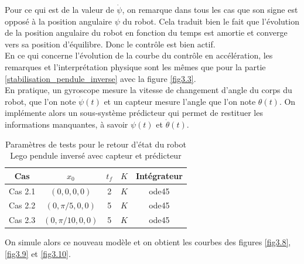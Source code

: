 \documentclass[a4paper]{article}
\begin{document}
                        Pour ce qui est de la valeur de $\dot \psi$, on remarque dans tous les cas que son signe est opposé à la position angulaire $\psi$ du robot.
                        Cela traduit bien le fait que l'évolution de la position angulaire du robot en fonction du temps est amortie et converge vers sa position d'équilibre.
                        Donc le contrôle est bien actif. \\

                        En ce qui concerne l'évolution de la courbe du contrôle en accélération, les remarques et l'interprétation physique sont les mêmes que pour
                        la partie \ref{stabilisation_pendule_inverse} avec la figure \ref{fig3.3}. \\

                        En pratique, un gyroscope mesure la vitesse de changement d'angle du corps du robot, que l'on note $\dot \psi (t)$
                        et un capteur mesure l'angle que l'on note $\theta (t)$.
                        On implémente alors un sous-système prédicteur qui permet de restituer les informations manquantes, à savoir
                        $\psi (t)$ et $\dot \theta (t)$.


                        \begin{table}[h!]
                                \centering
                                \begin{tabular}{|c||c|c|c|c|} \hline
                                        \textbf{Cas} & \textbf{$x_0$} & \textbf{$t_f$} & \textbf{$K$} & \textbf{Intégrateur} \\ \hline
                                        Cas 2.1 & $(0,0,0,0)$ & 2 & $K$ & ode45 \\ \hline
                                        Cas 2.2 & $(0,\pi/5,0,0)$ & 5 & $K$ & ode45 \\ \hline
                                        Cas 2.3 & $(0,\pi/10,0,0)$ & 5 & $K$ & ode45 \\ \hline
                                \end{tabular}
                                \label{table4}
                                \caption{Paramètres de tests pour le retour d'état du robot Lego pendule inversé avec capteur et prédicteur}
                        \end{table}

                        On simule alors ce nouveau modèle et on obtient les courbes des figures \ref{fig3.8}, \ref{fig3.9} et \ref{fig3.10}.
\end{document}
